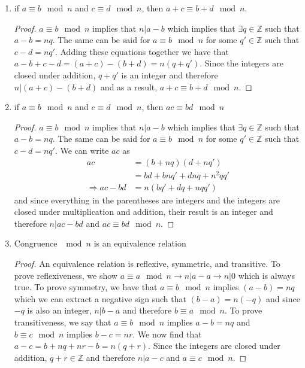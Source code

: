 \documentclass{article}
\newcommand{\Z}{\mathbb{Z}}
\theoremstyle{definition}
\begin{document}
\begin{enumerate}
    \item if $a\equiv b \mod n$ and $c\equiv d \mod n$, then $a+c\equiv b+d \mod n$.
    \begin{proof}
        $a\equiv b \mod n$ implies that $n|a-b$ which implies that $\exists q \in \Z$ such that $a-b=nq$. The same can be said for $a\equiv b \mod n$ for some $q' \in \Z$ such that $c-d=nq'$. Adding these equations together we have that $a-b+c-d = (a+c)-(b+d) = n(q+q')$. Since the integers are closed under addition, $q+q'$ is an integer and therefore $n|(a+c)-(b+d)$ and as a result, $a+c\equiv b+d \mod n$.
    \end{proof}
    \item if $a\equiv b \mod n$ and $c\equiv d \mod n$, then $ac\equiv bd \mod n$
    \begin{proof}
        $a\equiv b \mod n$ implies that $n|a-b$ which implies that $\exists q \in \Z$ such that $a-b=nq$. The same can be said for $a\equiv b \mod n$ for some $q' \in \Z$ such that $c-d=nq'$. We can write $ac$ as
        \begin{equation*}
            \begin{split}
                ac &=(b+nq)(d+nq') \\
                &=bd+bnq'+dnq+n^2qq' \\
                \Rightarrow ac-bd&=n(bq'+dq+nqq') 
            \end{split}
        \end{equation*}
        and since everything in the parentheses are integers and the integers are closed under multiplication and addition, their result is an integer and therefore $n|ac-bd$ and $ac\equiv bd \mod n$.
    \end{proof}
    \item Congruence $\!\!\!\!\mod n$ is an equivalence relation
    \begin{proof}
        An equivalence relation is reflexive, symmetric, and transitive. To prove reflexiveness, we show $a\equiv a \mod n \rightarrow n|a-a\rightarrow n|0$ which is always true. To prove symmetry, we have that $a\equiv b \mod n $ implies $(a-b)=nq$ which we can extract a negative sign such that $(b-a)=n(-q)$ and since $-q$ is also an integer, $n|b-a$ and therefore $b\equiv a\mod n$. To prove transitiveness, we say that $a\equiv b \mod n$ implies $a-b=nq$ and $b\equiv c\mod n$ implies $b-c=nr$. We now find that $a-c=b+nq+nr-b =n(q+r)$. Since the integers are closed under addition, $q+r\in \Z$ and therefore $n|a-c$ and $a\equiv c \mod n$.
    \end{proof}
\end{enumerate}
\end{document}
